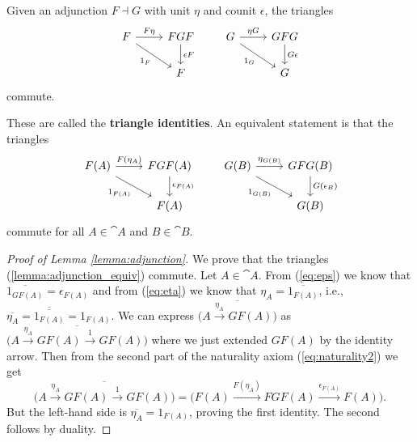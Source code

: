 \documentclass[11pt,a4paper]{article}
\begin{document}
\begin{lemma}\label{lemma:adjunction}
    Given an adjunction $F\dashv G$ with unit $\eta$ and counit $\epsilon$, the triangles
    \begin{equation*}
    \begin{tikzcd}
        F \arrow[r, "F\eta"] \arrow[dr, "1_F"'] & FGF \arrow[d, "\epsilon F"] \\
        & F
    \end{tikzcd}
    \qquad
    \begin{tikzcd}
        G \arrow[r, "\eta G"] \arrow[dr, "1_G"'] & GFG \arrow[d, "G\epsilon"] \\
        & G
    \end{tikzcd}
    \end{equation*}
    commute.
\end{lemma}
\begin{remark}
    These are called the \textbf{triangle identities}. An equivalent statement is that the triangles
    \begin{equation}\label{lemma:adjunction_equiv}
    \begin{tikzcd}
        F(A) \arrow[r, "F(\eta_A)"] \arrow[dr, "1_{F(A)}"'] & FGF(A) \arrow[d, "\epsilon_{F(A)}"] \\
        & F(A)
    \end{tikzcd}
    \qquad
    \begin{tikzcd}
        G(B) \arrow[r, "\eta_{G(B)}"] \arrow[dr, "1_{G(B)}"'] & GFG(B) \arrow[d, "G(\epsilon_B)"] \\
        & G(B)
    \end{tikzcd}
    \end{equation}
    commute for all $A\in\cat{A}$ and $B\in\cat{B}$.
\end{remark}
\begin{proof}[Proof of Lemma \ref{lemma:adjunction}]
    We prove that the triangles (\ref{lemma:adjunction_equiv}) commute. Let $A\in\cat{A}$. From (\ref{eq:eps}) we know that $\overline{1_{GF(A)}}=\epsilon_{F(A)}$ and from (\ref{eq:eta}) we know that $\eta_A = \overline{1_{F(A)}}$, i.e., $\overline{\eta_A}=\overline{\overline{1_{F(A)}}}=1_{F(A)}$. We can express $\overline{\big( A\xrightarrow{\eta_A}GF(A)\big)}$ as $\overline{\big( A\xrightarrow{\eta_A} GF(A) \xrightarrow{1} GF(A) \big)}$ where we just extended $GF(A)$ by the identity arrow. Then from the second part of the naturality axiom (\ref{eq:naturality2}) we get
    \begin{equation*}
        \overline{\big( A\xrightarrow{\eta_A} GF(A) \xrightarrow{1} GF(A) \big)} = \big( F(A) \xrightarrow{F(\eta_A)} FGF(A) \xrightarrow{\epsilon_{F(A)}} F(A) \big).
    \end{equation*}
    But the left-hand side is $\overline{\eta_A}=1_{F(A)}$, proving the first identity. The second follows by duality.
\end{proof}
\end{document}
